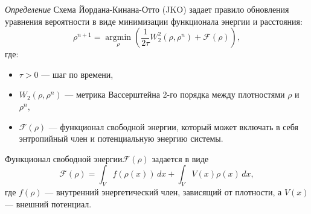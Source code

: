 \textit{Определение}  Схема Йордана-Кинана-Отто (JKO) задает правило обновления уравнения вероятности в виде
минимизации функционала энергии и расстояния:
\begin{equation}
    \rho^{n+1} = \underset{\rho}{\operatorname{argmin}} \left( \frac{1}{2\tau} W_2^2(\rho, \rho^n) + \mathcal{F}(\rho) \right),
\end{equation}
где:\begin{itemize}
    \item \(\tau > 0\) — шаг по времени,
    \item \(W_2(\rho, \rho^n)\) — метрика Вассерштейна 2-го порядка между плотностями \(\rho\) и \(\rho^n\),
    \item  \(\mathcal{F}(\rho)\) — функционал свободной энергии, который может включать в себя энтропийный член и 
    потенциальную энергию системы.
\end{itemize}
Функционал свободной энергии\(\mathcal{F}(\rho)\) задается в виде
\begin{equation}
    \mathcal{F}(\rho) = \int_V f(\rho(x)) \, dx + \int_V V(x) \rho(x) \, dx,
\end{equation}
где \(f(\rho)\) — внутренний энергетический член, зависящий от плотности, а \(V(x)\) — внешний потенциал.



